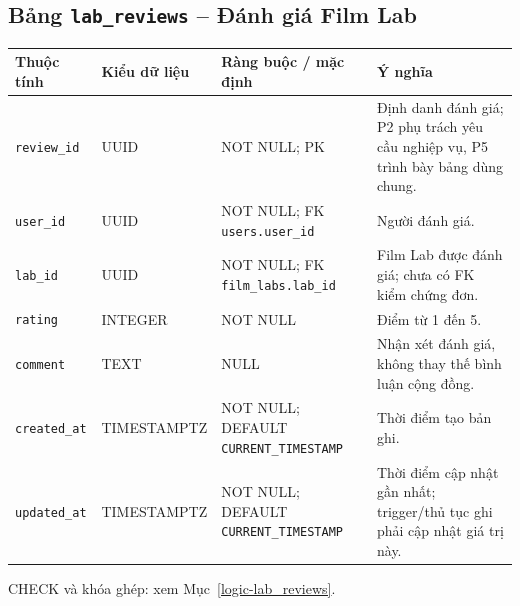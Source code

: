 \subsection{Bảng \texttt{lab\_\allowbreak{}reviews} -- Đánh giá Film Lab}
\label{dictionary-lab_reviews}
\begingroup
\footnotesize
\setlength{\tabcolsep}{3pt}
\begin{longtable}{>{\raggedright\arraybackslash}p{3.1cm}>{\raggedright\arraybackslash}p{2.5cm}>{\raggedright\arraybackslash}p{3.7cm}>{\raggedright\arraybackslash}p{4.3cm}}
\toprule
Thuộc tính & Kiểu dữ liệu & Ràng buộc / mặc định & Ý nghĩa \\
\midrule
\endhead
\texttt{review\_\allowbreak{}id} & UUID & NOT NULL; PK & Định danh đánh giá; P2 phụ trách yêu cầu nghiệp vụ, P5 trình bày bảng dùng chung. \\
\texttt{user\_\allowbreak{}id} & UUID & NOT NULL; FK \texttt{users.user\_\allowbreak{}id} & Người đánh giá. \\
\texttt{lab\_\allowbreak{}id} & UUID & NOT NULL; FK \texttt{film\_\allowbreak{}labs.lab\_\allowbreak{}id} & Film Lab được đánh giá; chưa có FK kiểm chứng đơn. \\
\texttt{rating} & INTEGER & NOT NULL & Điểm từ 1 đến 5. \\
\texttt{comment} & TEXT & NULL & Nhận xét đánh giá, không thay thế bình luận cộng đồng. \\
\texttt{created\_\allowbreak{}at} & TIMESTAMPTZ & NOT NULL; DEFAULT \texttt{CURRENT\_\allowbreak{}TIMESTAMP} & Thời điểm tạo bản ghi. \\
\texttt{updated\_\allowbreak{}at} & TIMESTAMPTZ & NOT NULL; DEFAULT \texttt{CURRENT\_\allowbreak{}TIMESTAMP} & Thời điểm cập nhật gần nhất; trigger/thủ tục ghi phải cập nhật giá trị này. \\
\bottomrule
\end{longtable}
\endgroup
CHECK và khóa ghép: xem Mục~\ref{logic-lab_reviews}.
